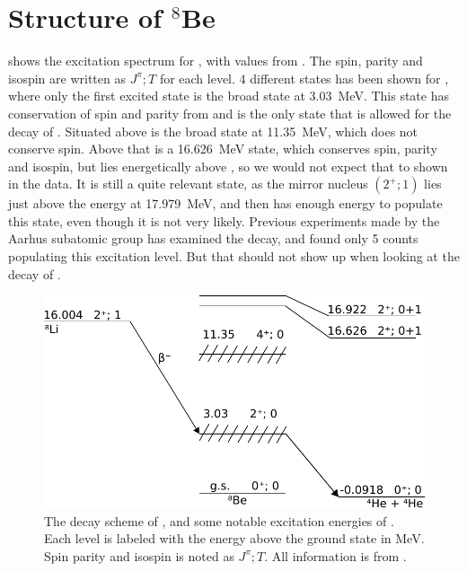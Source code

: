 \section{Structure of $^8$Be}
 shows the excitation spectrum for \ber, with values from \cite{TILLEY2004155}. The spin, parity and isospin are written as $J^\pi ; T$ for each level. 4 different states has been shown for \ber, where only the first excited state is the broad state at \SI{3.03}{MeV}. This state has conservation of spin and parity from \li and is the only state that is allowed for the decay of \li. Situated above is the broad state at \SI{11.35}{MeV}, which does not conserve spin. Above that is a \SI{16.626}{MeV} state, which conserves spin, parity and isospin, but lies energetically above \li, so we would not expect that to shown in the data. It is still a quite relevant state, as the mirror nucleus  $(2^+; 1)$ lies just above the energy at \SI{17.979}{MeV}, and then has enough energy to populate this state, even though it is not very likely. Previous experiments made by the Aarhus subatomic group has examined the decay, and found only 5 counts populating this excitation level. But that should not show up when looking at the decay of \li.


\begin{figure}
	\centering
	\includegraphics[width=\columnwidth]{../figures/DecayScheme.pdf}
	\caption{The decay scheme of \li, and some notable excitation energies of \ber. Each level is labeled with the energy above the \ber ground state in MeV. Spin parity and isospin is noted as $J^\pi; T$. All information is from \cite{TILLEY2004155}.}
	\label{fig:berStructure}
\end{figure}
